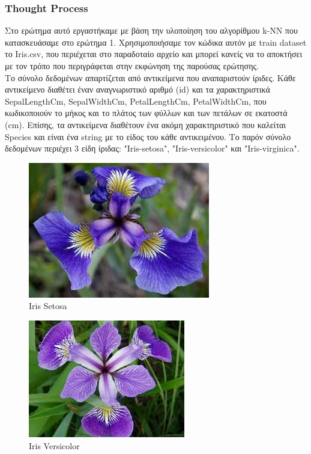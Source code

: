\documentclass[12pt]{article}
\newenvironment{matlab}
	{\begin{figure}[H]\centering\captionsetup{justification=centering}}
	{\end{figure}}
\begin{document}
\subsubsection*{Thought Process}

Στο ερώτημα αυτό εργαστήκαμε με βάση την υλοποίηση του αλγορίθμου k-NN που κατασκευάσαμε στο ερώτημα 1. Χρησιμοποιήσαμε τον κώδικα αυτόν με train dataset το Iris.csv, που περιέχεται στο παραδοταίο αρχείο και μπορεί κανείς να το αποκτήσει με τον τρόπο που περιγράφεται στην εκφώνηση της παρούσας ερώτησης. \\

Το σύνολο δεδομένων απαρτίζεται από αντικείμενα που αναπαριστούν ίριδες. Κάθε αντικείμενο διαθέτει έναν αναγνωριστικό αριθμό (id) και τα χαρακτηριστικά SepalLengthCm, SepalWidthCm, PetalLengthCm, PetalWidthCm, που κωδικοποιούν το μήκος και το πλάτος των φύλλων και των πετάλων σε εκατοστά (cm). Επίσης, τα αντικείμενα διαθέτουν ένα ακόμη χαρακτηριστικό που καλείται Species και είναι ένα string με το είδος του κάθε αντικειμένου. Το παρόν σύνολο δεδομένων περιέχει 3 είδη ίριδας: "Iris-setosa", "Iris-versicolor" και "Iris-virginica".

\begin{matlab}
	\includegraphics[scale=0.8]{images/iris_setosa.jpg}
	\caption{Iris Setosa}
\end{matlab}

\begin{matlab}
	\includegraphics[scale=0.89]{images/iris_versicolor.jpeg}
	\caption{Iris Versicolor}
\end{matlab}
\end{document}
